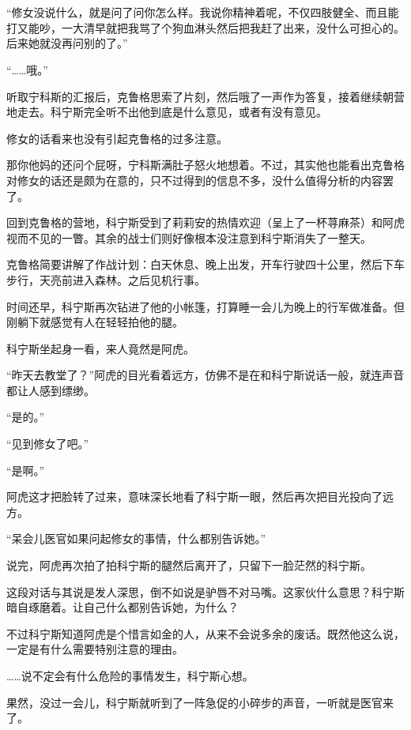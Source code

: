
\section*{}

“修女没说什么，就是问了问你怎么样。我说你精神着呢，不仅四肢健全、而且能打又能吵，一大清早就把我骂了个狗血淋头然后把我赶了出来，没什么可担心的。后来她就没再问别的了。”

“……哦。”

听取宁科斯的汇报后，克鲁格思索了片刻，然后哦了一声作为答复，接着继续朝营地走去。科宁斯完全听不出他到底是什么意见，或者有没有意见。

修女的话看来也没有引起克鲁格的过多注意。

那你他妈的还问个屁呀，宁科斯满肚子怒火地想着。不过，其实他也能看出克鲁格对修女的话还是颇为在意的，只不过得到的信息不多，没什么值得分析的内容罢了。

回到克鲁格的营地，科宁斯受到了莉莉安的热情欢迎（呈上了一杯荨麻茶）和阿虎视而不见的一瞥。其余的战士们则好像根本没注意到科宁斯消失了一整天。

克鲁格简要讲解了作战计划：白天休息、晚上出发，开车行驶四十公里，然后下车步行，天亮前进入森林。之后见机行事。

时间还早，科宁斯再次钻进了他的小帐篷，打算睡一会儿为晚上的行军做准备。但刚躺下就感觉有人在轻轻拍他的腿。

科宁斯坐起身一看，来人竟然是阿虎。

“昨天去教堂了？”阿虎的目光看着远方，仿佛不是在和科宁斯说话一般，就连声音都让人感到缥缈。

“是的。”

“见到修女了吧。”

“是啊。”

阿虎这才把脸转了过来，意味深长地看了科宁斯一眼，然后再次把目光投向了远方。

“呆会儿医官如果问起修女的事情，什么都别告诉她。”

说完，阿虎再次拍了拍科宁斯的腿然后离开了，只留下一脸茫然的科宁斯。

这段对话与其说是发人深思，倒不如说是驴唇不对马嘴。这家伙什么意思？科宁斯暗自琢磨着。让自己什么都别告诉她，为什么？

不过科宁斯知道阿虎是个惜言如金的人，从来不会说多余的废话。既然他这么说，一定是有什么需要特别注意的理由。

……说不定会有什么危险的事情发生，科宁斯心想。

果然，没过一会儿，科宁斯就听到了一阵急促的小碎步的声音，一听就是医官来了。

